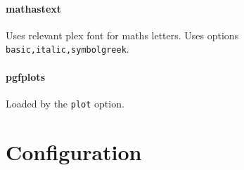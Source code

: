 \documentclass[solid,math,chem,code,plot,gloss]{bmc}
\begin{document}
\paragraph{\ttfamily mathastext}\label{par:mathastext}
Uses relevant plex font for maths letters.
Uses options \texttt{basic,italic,symbolgreek}.

\paragraph{\ttfamily pgfplots}\label{par:pgfplots}
Loaded by the \texttt{plot} option.

\section{Configuration}
\end{document}
